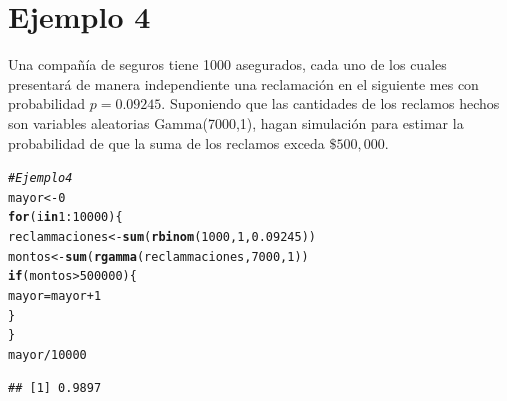 \documentclass[10pt]{article}\usepackage[]{graphicx}\usepackage[]{xcolor}
\makeatletter
\newcommand{\hlnum}[1]{\textcolor[rgb]{0.686,0.059,0.569}{#1}}%
\newcommand{\hlcom}[1]{\textcolor[rgb]{0.678,0.584,0.686}{\textit{#1}}}%
\newcommand{\hlopt}[1]{\textcolor[rgb]{0,0,0}{#1}}%
\newcommand{\hlstd}[1]{\textcolor[rgb]{0.345,0.345,0.345}{#1}}%
\newcommand{\hlkwa}[1]{\textcolor[rgb]{0.161,0.373,0.58}{\textbf{#1}}}%
\newcommand{\hlkwb}[1]{\textcolor[rgb]{0.69,0.353,0.396}{#1}}%
\newcommand{\hlkwd}[1]{\textcolor[rgb]{0.737,0.353,0.396}{\textbf{#1}}}%
\newenvironment{kframe}{%
 \def\at@end@of@kframe{}%
 \ifinner\ifhmode%
  \def\at@end@of@kframe{\end{minipage}}%
  \begin{minipage}{\columnwidth}%
 \fi\fi%
 \def\FrameCommand##1{\hskip\@totalleftmargin \hskip-\fboxsep
 \colorbox{shadecolor}{##1}\hskip-\fboxsep
     \hskip-\linewidth \hskip-\@totalleftmargin \hskip\columnwidth}%
 \MakeFramed {\advance\hsize-\width
   \@totalleftmargin\z@ \linewidth\hsize
   \@setminipage}}%
 {\par\unskip\endMakeFramed%
 \at@end@of@kframe}
\newenvironment{knitrout}{}{} %
\makeatother
\begin{document}
\section{Ejemplo 4}
Una compañía de seguros tiene 1000 asegurados, cada uno de los cuales presentará de manera independiente una reclamación en el siguiente mes con probabilidad $p = 0.09245$. Suponiendo que las cantidades de los reclamos hechos son variables aleatorias Gamma(7000,1), hagan simulación para estimar la probabilidad de que la suma de los reclamos exceda $\$ 500,000$.
\begin{knitrout}
\color{fgcolor}\begin{kframe}
\begin{alltt}
\hlcom{#Ejemplo 4}
\hlstd{mayor} \hlkwb{<-} \hlnum{0}
\hlkwa{for}\hlstd{(i} \hlkwa{in} \hlnum{1}\hlopt{:}\hlnum{10000}\hlstd{)\{}
  \hlstd{reclammaciones}\hlkwb{<-}\hlkwd{sum}\hlstd{(}\hlkwd{rbinom}\hlstd{(}\hlnum{1000}\hlstd{,} \hlnum{1}\hlstd{,} \hlnum{0.09245}\hlstd{))}
  \hlstd{montos} \hlkwb{<-} \hlkwd{sum}\hlstd{(}\hlkwd{rgamma}\hlstd{(reclammaciones,} \hlnum{7000}\hlstd{,} \hlnum{1}\hlstd{))}
  \hlkwa{if}\hlstd{(montos} \hlopt{>} \hlnum{500000}\hlstd{)\{}
    \hlstd{mayor}\hlkwb{=} \hlstd{mayor}\hlopt{+}\hlnum{1}
  \hlstd{\}}
\hlstd{\}}
\hlstd{mayor}\hlopt{/}\hlnum{10000}
\end{alltt}
\begin{verbatim}
## [1] 0.9897
\end{verbatim}
\end{kframe}
\end{knitrout}



\end{document}
